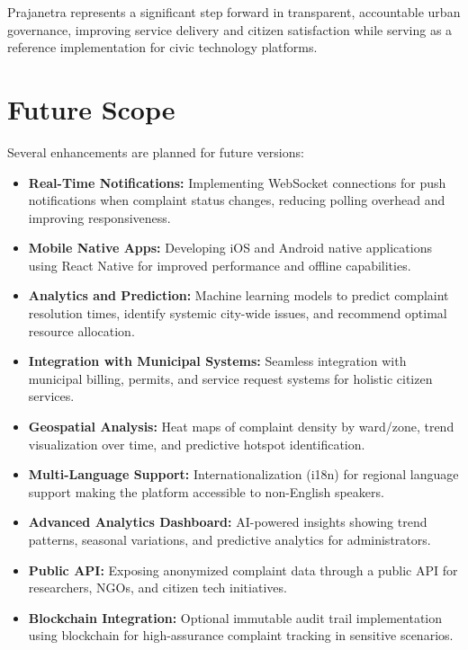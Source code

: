 \documentclass[12pt,a4paper]{report}
\begin{document}
Prajanetra represents a significant step forward in transparent, accountable urban governance, improving service delivery and citizen satisfaction while serving as a reference implementation for civic technology platforms.

\section{Future Scope}
Several enhancements are planned for future versions:

\begin{itemize}
    \item \textbf{Real-Time Notifications:} Implementing WebSocket connections for push notifications when complaint status changes, reducing polling overhead and improving responsiveness.
    
    \item \textbf{Mobile Native Apps:} Developing iOS and Android native applications using React Native for improved performance and offline capabilities.
    
    \item \textbf{Analytics and Prediction:} Machine learning models to predict complaint resolution times, identify systemic city-wide issues, and recommend optimal resource allocation.
    
    \item \textbf{Integration with Municipal Systems:} Seamless integration with municipal billing, permits, and service request systems for holistic citizen services.
    
    \item \textbf{Geospatial Analysis:} Heat maps of complaint density by ward/zone, trend visualization over time, and predictive hotspot identification.
    
    \item \textbf{Multi-Language Support:} Internationalization (i18n) for regional language support making the platform accessible to non-English speakers.
    
    \item \textbf{Advanced Analytics Dashboard:} AI-powered insights showing trend patterns, seasonal variations, and predictive analytics for administrators.
    
    \item \textbf{Public API:} Exposing anonymized complaint data through a public API for researchers, NGOs, and citizen tech initiatives.
    
    \item \textbf{Blockchain Integration:} Optional immutable audit trail implementation using blockchain for high-assurance complaint tracking in sensitive scenarios.
\end{itemize}
\end{document}
